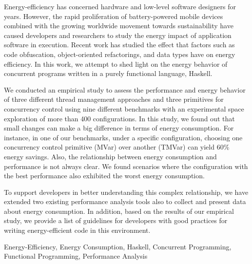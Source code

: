 Energy-efficiency has concerned hardware and low-level software designers for years. However, the rapid proliferation of battery-powered mobile devices combined with the growing worldwide movement towards sustainability have caused developers and researchers to study the energy impact of application software in execution. Recent work has studied the effect that factors such as code obfuscation, object-oriented refactorings, and data types have on energy efficiency. In this work, we attempt to shed light on the energy behavior of concurrent programs written in a purely functional language, Haskell.

We conducted an empirical study to assess the performance and energy behavior of three different thread management approaches and three primitives for concurrency control using nine different benchmarks with an experimental space exploration of more than 400 configurations. In this study, we found out that small changes can make a big difference in terms of energy consumption. For instance, in one of our benchmarks, under a specific configuration, choosing one concurrency control primitive (MVar) over another (TMVar) can yield 60\% energy savings. Also, the relationship between energy consumption and performance is not always clear. We found scenarios where the configuration with the best performance also exhibited the worst energy consumption.

To support developers in better understanding this complex relationship, we have extended two existing performance analysis tools also to collect and present data about energy consumption. In addition, based on the results of our empirical study, we provide a list of guidelines for developers with good practices for writing energy-efficient code in this environment.

\begin{keywords}
Energy-Efficiency, Energy Consumption, Haskell, Concurrent Programming, Functional Programming, Performance Analysis
\end{keywords}
